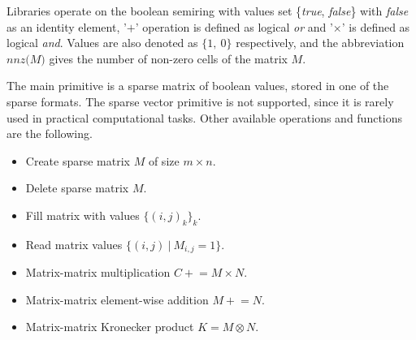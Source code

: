 Libraries operate on the boolean semiring with values set \{\textit{true}, \textit{false}\} with \textit{false} as an identity element, '$+$' operation is defined as logical \textit{or} and '$\times$' is defined as logical \textit{and}.
Values are also denoted as $\{1,~0\}$ respectively, and the abbreviation $\textit{nnz(M)}$ gives the number of non-zero cells of the matrix $M$.

The main primitive is a sparse matrix of boolean values, stored in one of the sparse formats.
The sparse vector primitive is not supported, since it is rarely used in practical computational tasks.
Other available operations and functions are the following.


\begin{itemize}
    \item Create sparse matrix $M$ of size $m \times n$.
    \item Delete sparse matrix $M$.
    \item Fill matrix with values $\{(i,j)_k\}_k$.
    \item Read matrix values $\{(i, j)~|~M_{i,j} = 1\}$.
    \item Matrix-matrix multiplication $C \mathrel{+}= M \times N$.
    \item Matrix-matrix element-wise addition $M \mathrel{+}= N$.
    \item Matrix-matrix Kronecker product $K = M \otimes N$.
\end{itemize}